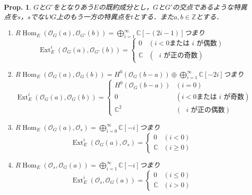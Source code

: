\documentclass[uplatex,a4paper,11pt,dvipdfmx]{jsarticle}
\theoremstyle{mystyle} %
\newtheorem{proposition}[theorem]{Prop.}
\DeclareMathOperator{\Hom}{Hom}
\DeclareMathOperator{\Ext}{Ext}
\begin{document}
\begin{proposition}
	$G$と$G'$をとなりあう$E$の既約成分とし，$G$と$G'$の交点であるような特異点を$s$，$s$でない$G$上のもう一方の特異点を$t$とする．また$a, b \in \mathbb{Z}$とする．
	\begin{enumerate}
		\item $R\Hom_E(\mathcal{O}_G(a), \mathcal{O}_{G'}(b)) = \bigoplus_{i=1}^\infty \mathbb{C}[-(2i-1)]$つまり$$\Ext^i_E(\mathcal{O}_G(a), \mathcal{O}_{G'}(b)) = \left \{
			      \begin{array}{ll}
				      0          & (i<0 \text{または $i$ が偶数}) \\
				      \mathbb{C} & (\text{ $i$ が正の奇数})
			      \end{array}
			      \right.$$
		\item $R\Hom_E(\mathcal{O}_G(a), \mathcal{O}_G(b)) = H^0(\mathcal{O}_G(b-a)) \oplus \bigoplus_{i=1}^\infty \mathbb{C}[-2i]$つまり$$\Ext^i_E(\mathcal{O}_G(a), \mathcal{O}_G(b)) =\left \{
			      \begin{array}{ll}
				      H^0(\mathcal{O}_G(b-a)) & (i=0)                            \\
				      0                       & (i < 0 \text{または $i$ が奇数}) \\
				      \mathbb{C}^2            & (\text{ $i$ が正の偶数})
			      \end{array}
			      \right.$$
		\item $R\Hom_E(\mathcal{O}_G(a), \mathcal{O}_s) = \bigoplus_{i=0}^\infty \mathbb{C}[-i]$つまり$$\Ext^i_E(\mathcal{O}_G(a), \mathcal{O}_s) =\left \{
			      \begin{array}{ll}
				      0          & (i< 0)    \\
				      \mathbb{C} & (i\geq 0)
			      \end{array}
			      \right.$$
		\item $R\Hom_E(\mathcal{O}_s, \mathcal{O}_G(a)) = \bigoplus_{i=1}^\infty \mathbb{C}[-i]$つまり$$\Ext^i_E(\mathcal{O}_s, \mathcal{O}_G(a)) =\left \{
			      \begin{array}{ll}
				      0          & (i\leq 0) \\
				      \mathbb{C} & (i>0)
			      \end{array}
			      \right.$$
	\end{enumerate}
\end{proposition}
\end{document}
